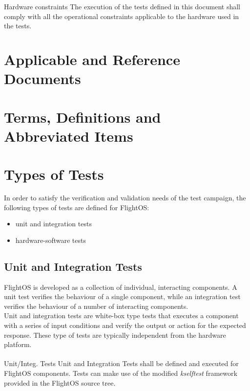  {Hardware constraints}{%
The execution of the tests defined in this document shall comply with all %
the operational constraints applicable to the hardware used in the tests.%
}{}



\chapter{Applicable and Reference Documents} %

\printbibliography[heading=none]


\chapter{Terms, Definitions and Abbreviated Items}
\printglossary[type=acronym]
\printglossary[type=main, style=altlist]


\chapter{Types of Tests}

In order to satisfy the verification and validation needs of the test campaign,
the following types of tests are defined for FlightOS:
\begin{itemize}
	\item unit and integration tests
	\item hardware-software tests
\end{itemize}


\section {Unit and Integration Tests}

FlightOS is developed as a collection of individual, interacting components.
A unit test verifies the behaviour of a single component, while an integration
test verifies the behaviour of a number of interacting components. \\

\noindent
Unit and integration tests are white-box type tests that executes a component
with a series of input conditions and verify the output or action for the
expected response. These type of tests are typically independent from the
hardware platform.\\
\\

 {Unit/Integ. Tests}{%
Unit and Integration Tests shall be defined and executed for FlightOS components.
}{Tests can make use of the modified \emph{kselftest} framework provided %
in the FlightOS source tree.
}%

